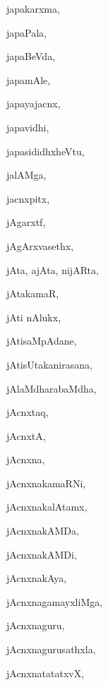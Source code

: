 \begin{multicols}{3}
{\noindent
{japakarxma}, \pageref{japakarxma}

\noindent
{japaPala}, \pageref{japaPala}

\noindent
{japaBeVda}, \pageref{japaBeVda}

\noindent
{japamAle}, \pageref{japamAle}

\noindent
{japayajacnx}, \pageref{japayajacnx}

\noindent
{japavidhi}, \pageref{japavidhi}

\noindent
{japasididhxheVtu}, \pageref{japasididhxheVtu}

\noindent
{jalAMga}, \pageref{jalAMga}

\noindent
{jacnxpitx}, \pageref{jacnxpitx}

\noindent
{jAgarxtf}, \pageref{jAgarxtf}

\noindent
{jAgArxvasethx}, \pageref{jAgArxvasethx}

\noindent
{jAta, ajAta, nijARta}, \pageref{jAta, ajAta, nijARta}

\noindent
{jAtakamaR}, \pageref{jAtakamaR}

\noindent
{jAti nAlukx}, \pageref{jAti nAlukx}

\noindent
{jAtisaMpAdane}, \pageref{jAtisaMpAdane}

\noindent
{jAtisUtakanirasana}, \pageref{jAtisUtakanirasana}

\noindent
{jAlaMdharabaMdha}, \pageref{jAlaMdharabaMdha}

\noindent
{jAcnxtaq}, \pageref{jAcnxtaq}

\noindent
{jAcnxtA}, \pageref{jAcnxtA}

\noindent
{jAcnxna}, \pageref{jAcnxna}

\noindent
{jAcnxnakamaRNi}, \pageref{jAcnxnakamaRNi}

\noindent
{jAcnxnakalAtamx}, \pageref{jAcnxnakalAtamx}

\noindent
{jAcnxnakAMDa}, \pageref{jAcnxnakAMDa}

\noindent
{jAcnxnakAMDi}, \pageref{jAcnxnakAMDi}

\noindent
{jAcnxnakAya}, \pageref{jAcnxnakAya}

\noindent
{jAcnxnagamayxliMga}, \pageref{jAcnxnagamayxliMga}

\noindent
{jAcnxnaguru}, \pageref{jAcnxnaguru}

\noindent
{jAcnxnagurusathxla}, \pageref{jAcnxnagurusathxla}

\noindent
{jAcnxnatatatxvX}, \pageref{jAcnxnatatatxvX}

}
\end{multicols}
